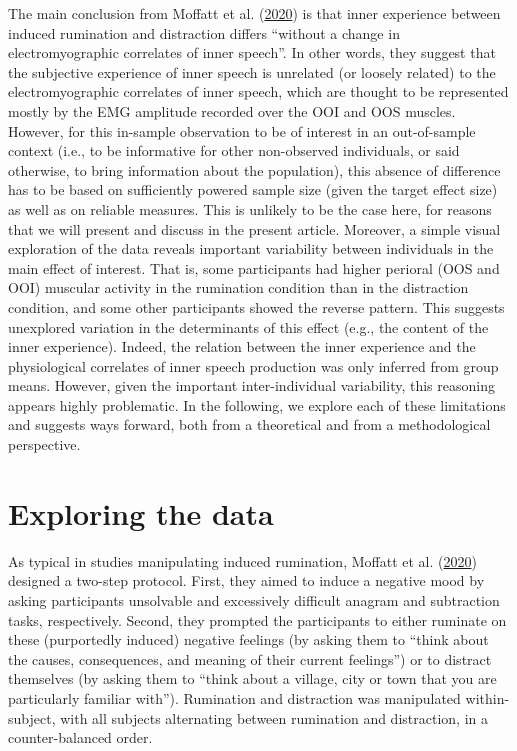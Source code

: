 \documentclass[
  english,
  man, donotrepeattitle,floatsintext]{apa6}
\begin{document}
The main conclusion from Moffatt et al. (\protect\hyperlink{ref-moffatt_inner_2020}{2020}) is that inner experience between induced rumination and distraction differs ``without a change in electromyographic correlates of inner speech''. In other words, they suggest that the subjective experience of inner speech is unrelated (or loosely related) to the electromyographic correlates of inner speech, which are thought to be represented mostly by the EMG amplitude recorded over the OOI and OOS muscles. However, for this in-sample observation to be of interest in an out-of-sample context (i.e., to be informative for other non-observed individuals, or said otherwise, to bring information about the population), this absence of difference has to be based on sufficiently powered sample size (given the target effect size) as well as on reliable measures. This is unlikely to be the case here, for reasons that we will present and discuss in the present article. Moreover, a simple visual exploration of the data reveals important variability between individuals in the main effect of interest. That is, some participants had higher perioral (OOS and OOI) muscular activity in the rumination condition than in the distraction condition, and some other participants showed the reverse pattern. This suggests unexplored variation in the determinants of this effect (e.g., the content of the inner experience). Indeed, the relation between the inner experience and the physiological correlates of inner speech production was only inferred from group means. However, given the important inter-individual variability, this reasoning appears highly problematic. In the following, we explore each of these limitations and suggests ways forward, both from a theoretical and from a methodological perspective.

\hypertarget{exploring-the-data}{%
\section{Exploring the data}\label{exploring-the-data}}

As typical in studies manipulating induced rumination, Moffatt et al. (\protect\hyperlink{ref-moffatt_inner_2020}{2020}) designed a two-step protocol. First, they aimed to induce a negative mood by asking participants unsolvable and excessively difficult anagram and subtraction tasks, respectively. Second, they prompted the participants to either ruminate on these (purportedly induced) negative feelings (by asking them to ``think about the causes, consequences, and meaning of their current feelings'') or to distract themselves (by asking them to ``think about a village, city or town that you are particularly familiar with''). Rumination and distraction was manipulated within-subject, with all subjects alternating between rumination and distraction, in a counter-balanced order.
\end{document}
